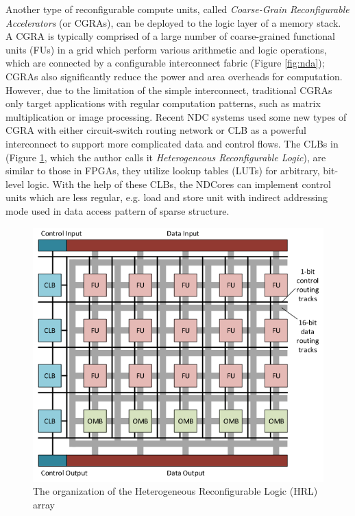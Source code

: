 \documentclass[letterpaper, 11pt, conference, margin=1in]{ieeeconf}   %
\begin{document}
Another type of reconfigurable compute units, called \textit{Coarse-Grain Reconfigurable Accelerators} (or CGRAs), can be deployed to the logic layer of a memory stack. A CGRA is typically comprised of a large number of coarse-grained functional units (FUs) in a grid which perform various arithmetic and logic operations, which are connected by a configurable interconnect fabric (Figure \ref{fig:nda}); CGRAs also significantly reduce the power and area overheads for computation. However, due to the limitation of the simple interconnect, traditional CGRAs only target applications with regular computation patterns, such as matrix multiplication or image processing. Recent NDC systems \cite{7056040, 7446059} used some new types of CGRA with either circuit-switch routing network \cite{7056040} or CLB \cite{7446059} as a powerful interconnect to support more complicated data and control flows. The CLBs in  \cite{7446059} (Figure \ref{fig:hrl}, which the author calls it \textit{Heterogeneous Reconfigurable Logic}), are similar to those in FPGAs, they utilize lookup tables (LUTs) for arbitrary, bit-level logic. With the help of these CLBs, the NDCores can implement control units which are less regular, e.g. load and store unit with indirect addressing mode used in data access pattern of sparse structure.

\begin{figure}[h]
  \centering
  \includegraphics[scale=0.35]{figures/hrl.png}
  \caption{The organization of the Heterogeneous Reconfigurable Logic (HRL) array \cite{7446059}}
  \label{fig:hrl}
\end{figure}
\end{document}
